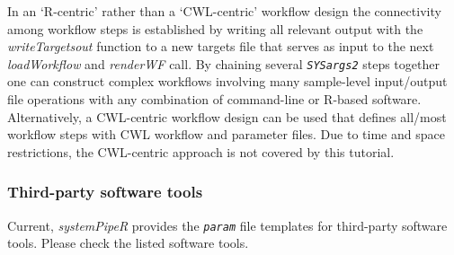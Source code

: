 \documentclass[14pt,]{article}
\begin{document}
In an `R-centric' rather than a `CWL-centric' workflow design the connectivity
among workflow steps is established by writing all relevant output with the
\emph{writeTargetsout} function to a new targets file that serves as input to the
next \emph{loadWorkflow} and \emph{renderWF} call. By chaining several \emph{\texttt{SYSargs2}} steps
together one can construct complex workflows involving many sample-level
input/output file operations with any combination of command-line or R-based
software. Alternatively, a CWL-centric workflow design can be used that defines
all/most workflow steps with CWL workflow and parameter files. Due to time and
space restrictions, the CWL-centric approach is not covered by this tutorial.

\hypertarget{tools}{%
\subsubsection{Third-party software tools}\label{tools}}

Current, \emph{systemPipeR} provides the \emph{\texttt{param}} file templates for third-party software tools. Please check the listed software tools.
\end{document}
